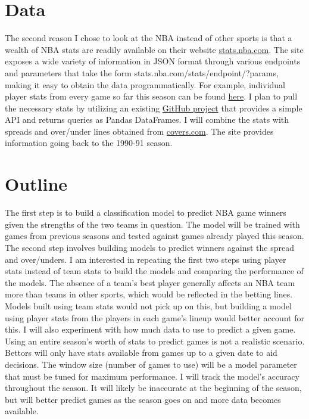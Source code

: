 \documentclass{article}
\begin{document}
\section{Data}
The second reason I chose to look at the NBA instead of other sports is that a wealth of NBA stats are readily available on their website \url{stats.nba.com}. The site exposes a wide variety of information in JSON format through various endpoints and parameters that take the form stats.nba.com/stats/{endpoint}/?{params}, making it easy to obtain the data programmatically. For example, individual player stats from every game so far this season can be found \href{http://stats.nba.com/stats/leaguegamelog/?LeagueID=00&Season=2016-17&SeasonType=Regular\%20Season&PlayerOrTeam=P&Sorter=PTS&Direction=DESC}{here}. I plan to pull the necessary  stats by utilizing an existing \href{https://github.com/seemethere/nba_py}{GitHub project} that provides a simple API and returns queries as Pandas DataFrames. I will combine the stats with spreads and over/under lines obtained from \url{covers.com}. The site provides information going back to the 1990-91 season.
\section{Outline}
The first step is to build a classification model to predict NBA game winners given the strengths of the two teams in question. The model will be trained with games from previous seasons and tested against games already played this season. The second step involves building models to predict winners against the spread and over/unders. I am interested in repeating the first two steps using player stats instead of team stats to build the models and comparing the performance of the models. The absence of a team's best player generally affects an NBA team more than teams in other sports, which would be reflected in the betting lines. Models built using team stats would not pick up on this, but building a model using player stats from the players in each game's lineup would better account for this. I will also experiment with how much data to use to predict a given game. Using an entire season's worth of stats to predict games is not a realistic scenario. Bettors will only have stats available from games up to a given date to aid decisions. The window size (number of games to use) will be a model parameter that must be tuned for maximum performance. I will track the model's accuracy throughout the season. It will likely be inaccurate at the beginning of the season, but will better predict games as the season goes on and more data becomes available.
\printbibliography
\end{document}
